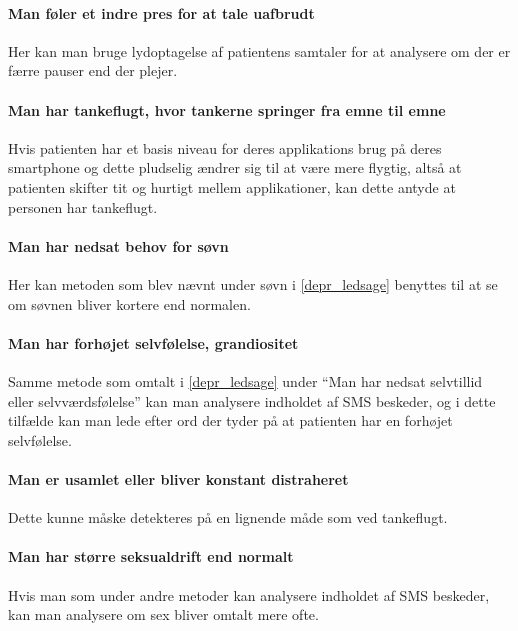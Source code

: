 \paragraph{Man føler et indre pres for at tale uafbrudt}
Her kan man bruge lydoptagelse af patientens samtaler for at analysere om der er færre pauser end der plejer.

\paragraph{Man har tankeflugt, hvor tankerne springer fra emne til emne}
Hvis patienten har et basis niveau for deres applikations brug på deres smartphone og dette pludselig ændrer sig til at være mere flygtig, altså at patienten skifter tit og hurtigt mellem applikationer, kan dette antyde at personen har tankeflugt.  

\paragraph{Man har nedsat behov for søvn}
Her kan metoden som blev nævnt under søvn i \cref{depr_ledsage} benyttes til at se om søvnen bliver kortere end normalen.

\paragraph{Man har forhøjet selvfølelse, grandiositet}
Samme metode som omtalt i \cref{depr_ledsage} under ``Man har nedsat selvtillid eller selvværdsfølelse'' kan man analysere indholdet af SMS beskeder, og i dette tilfælde kan man lede efter ord der tyder på at patienten har en forhøjet selvfølelse.

\paragraph{Man er usamlet eller bliver konstant distraheret}
Dette kunne måske detekteres på en lignende måde som ved tankeflugt.

\paragraph{Man har større seksualdrift end normalt}
Hvis man som under andre metoder kan analysere indholdet af SMS beskeder, kan man analysere om sex bliver omtalt mere ofte.




